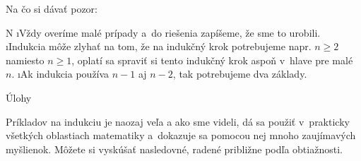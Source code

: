Na čo si dávať pozor:

\begitems \style N
\i Vždy overíme malé prípady a~do riešenia zapíšeme, že sme to urobili.
\i Indukcia môže zlyhať na tom, že na indukčný krok potrebujeme napr. $n \ge 2$ namiesto $n \ge 1$, oplatí sa spraviť si tento indukčný krok aspoň v~hlave pre malé $n$.
\i Ak indukcia používa $n-1$ aj $n-2$, tak potrebujeme dva základy.
\enditems

\sec Úlohy

Príkladov na indukciu je naozaj veľa a ako sme videli, dá sa použiť v~prakticky všetkých oblastiach matematiky a~dokazuje sa pomocou nej mnoho zaujímavých myšlienok. Môžete si vyskúšať nasledovné, radené približne podľa obtiažnosti.


